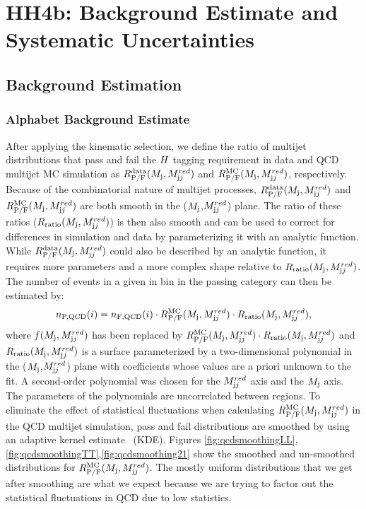 \chapter{HH4b: Background Estimate and Systematic Uncertainties}
\label{chap:six}

\section{Background Estimation\label{sec:BkgEst}}

\subsection{Alphabet Background Estimate\label{ss:Alphabet}}
After applying the kinematic selection, we define the ratio of multijet distributions that pass and fail the $H$ tagging requirement in data and QCD multijet MC simulation as $R^\mathrm{data}_\mathrm{P/F}(M_{\textrm j},M_{\textrm jj}^{red})$ and $R^\mathrm{MC}_\mathrm{P/F}(M_{\textrm j},M_{\textrm jj}^{red})$, respectively. Because of the combinatorial nature of multijet processes, $R^\mathrm{data}_\mathrm{P/F}(M_{\textrm j},M_{\textrm jj}^{red})$ and $R^\mathrm{MC}_\mathrm{P/F}(M_{\textrm j},M_{\textrm jj}^{red})$ are both smooth in the ($M_{\textrm j}$,$M_{\textrm jj}^{red}$) plane. The ratio of these ratios ($R_\mathrm{ratio}(M_{\textrm j},M_{\textrm jj}^{red})$) is then also smooth and can be used to correct for differences in simulation and data by parameterizing it with an analytic function. While $R^\mathrm{data}_\mathrm{P/F}(M_{\textrm j},M_{\textrm jj}^{red})$ could also be described by an analytic function, it requires more parameters and a more complex shape relative to $R_\mathrm{ratio}(M_{\textrm j},M_{\textrm jj}^{red})$. The number of events in a given in bin in the passing category can then be estimated by:
\begin{equation}
    n_{\text{P,QCD}}(i) = n_{\text{F,QCD}}(i) \cdot R^\mathrm{MC}_\mathrm{P/F}(M_{\textrm j},M_{\textrm jj}^{red}) \cdot R_\mathrm{ratio}(M_{\textrm j},M_{\textrm jj}^{red}),
    \label{eq:passDef}
\end{equation}
where $f(M_{\textrm j},M_{\textrm jj}^{red})$ has been replaced by $R^\mathrm{MC}_\mathrm{P/F}(M_{\textrm j},M_{\textrm jj}^{red}) \cdot R_\mathrm{ratio}(M_{\textrm j},M_{\textrm jj}^{red})$ and $R_\mathrm{ratio}(M_{\textrm j},M_{\textrm jj}^{red})$ is a surface parameterized by a two-dimensional polynomial in the ($M_{\textrm j}$,$M_{\textrm jj}^{red}$) plane with coefficients whose values are a priori unknown to the fit. 
A second-order polynomial was chosen for the $M_{\textrm jj}^{red}$ axis and the $M_{\textrm j}$ axis. The parameters of the polynomials are uncorrelated between regions. 
To eliminate the effect of statistical fluctuations when calculating $R^\mathrm{MC}_\mathrm{P/F}(M_{\textrm j},M_{\textrm jj}^{red})$ in the QCD multijet simulation, pass and fail distributions are smoothed by using an adaptive kernel estimate~\cite{Cranmer2000KernelEI} (KDE). 
Figures \ref{fig:qcdsmoothingLL},\ref{fig:qcdsmoothingTT},\ref{fig:qcdsmoothing21} show the smoothed and un-smoothed distributions for $R^\mathrm{MC}_\mathrm{P/F}(M_{\textrm j},M_{\textrm jj}^{red})$. The mostly uniform distributions that we get after smoothing are what we expect 
because we are trying to factor out the statistical fluctuations in QCD due to low statistics. 
